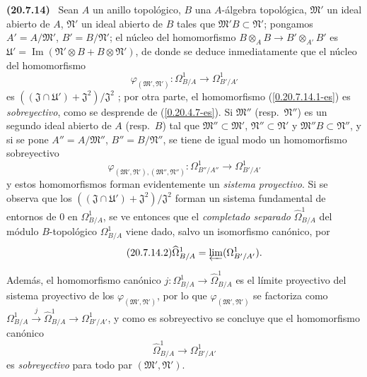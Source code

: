 \documentclass[10pt,oneside]{book}
\makeatletter
\newcommand{\sref}[1]{\textup{(\ref{#1})}}
\newcommand{\setmanualcurrentlabel}[1]{\def\@currentlabel{#1}}
\newcommand{\oldpage}[2][]{%
  \setcounter{footnote}{0}%
  \marginpar{\scriptsize\textbf{#1}~|~#2}\ignorespaces}
\newenvironment{env}[1][]{\setmanualcurrentlabel{#1}\par\medskip\noindent\textbf{(#1)}\ }{\par}
\makeatother
\begin{document}
\begin{env}[20.7.14]
\label{0.20.7.14-es}
Sean $A$ un anillo topológico, $B$ una $A$-álgebra topológica,
$\mathfrak{M}'$ un ideal abierto de $A$, $\mathfrak{N}'$ un ideal abierto de
$B$ tales que $\mathfrak{M}'B\subset\mathfrak{N}'$; pongamos
$A'=A/\mathfrak{M}'$,
\oldpage[0\textsubscript{IV-1}]{151}
$B'=B/\mathfrak{N}'$; el núcleo del homomorfismo
$B\otimes_A B\to B'\otimes_{A'}B'$ es
$\mathfrak{U}'=\operatorname{Im}(\mathfrak{N}'\otimes B+B\otimes\mathfrak{N}')$,
de donde se deduce inmediatamente que el núcleo del homomorfismo
\begin{equation}
\tag{20.7.14.1}
\label{0.20.7.14.1-es}
  \varphi_{(\mathfrak{M}',\mathfrak{N}')}:
  \Omega^1_{B/A}\to\Omega^1_{B'/A'}
\end{equation}
es $((\mathfrak{J}\cap\mathfrak{U}')+\mathfrak{J}^2)/\mathfrak{J}^2$ ; por
otra parte, el homomorfismo \sref{0.20.7.14.1-es} es \emph{sobreyectivo}, como se
desprende de \sref{0.20.4.7-es}. Si $\mathfrak{M}''$ (resp.\
$\mathfrak{N}''$) es un segundo ideal abierto de $A$ (resp.\ $B$) tal que
$\mathfrak{M}''\subset\mathfrak{M}'$, $\mathfrak{N}''\subset\mathfrak{N}'$
y $\mathfrak{M}''B\subset\mathfrak{N}''$, y si se pone
$A''=A/\mathfrak{M}''$, $B''=B/\mathfrak{N}''$, se tiene de igual modo un
homomorfismo sobreyectivo
\[
  \varphi_{(\mathfrak{M}',\mathfrak N'),(\mathfrak M'',\mathfrak N'')}:
  \Omega^1_{B''/A''}\to\Omega^1_{B'/A'}
\]
y estos homomorfismos forman evidentemente un \emph{sistema proyectivo}. Si
se observa que los
$((\mathfrak{J}\cap\mathfrak{U}')+\mathfrak{J}^2)/\mathfrak{J}^2$ forman
un sistema fundamental de entornos de $0$ en $\Omega^1_{B/A}$, se ve
entonces que el \emph{completado separado} $\widehat{\Omega}^1_{B/A}$ del
módulo $B$-topológico $\Omega^1_{B/A}$ viene dado, salvo un isomorfismo
canónico, por
\begin{equation}
\tag{20.7.14.2}
\label{0.20.7.14.2-es}
  \widehat{\Omega}^1_{B/A}=\varprojlim(\Omega^1_{B'/A'}).
\end{equation}

Además, el homomorfismo canónico
$j:\Omega^1_{B/A}\to\widehat{\Omega}^1_{B/A}$ es el límite proyectivo del
sistema proyectivo de los $\varphi_{(\mathfrak{M}',\mathfrak{N}')}$, por lo que
$\varphi_{(\mathfrak{M}',\mathfrak{N}')}$ se factoriza como
$\Omega^1_{B/A}\xrightarrow{j}\widehat{\Omega}^1_{B/A}\to
\Omega^1_{B'/A'}$, y como es sobreyectivo se concluye que el homomorfismo
canónico
\begin{equation}
\tag{20.7.14.3}
\label{0.20.7.14.3-es}
  \widehat{\Omega}^1_{B/A}\to\Omega^1_{B'/A'}
\end{equation}
es \emph{sobreyectivo} para todo par $(\mathfrak{M}',\mathfrak{N}')$.


\end{env}
\end{document}
